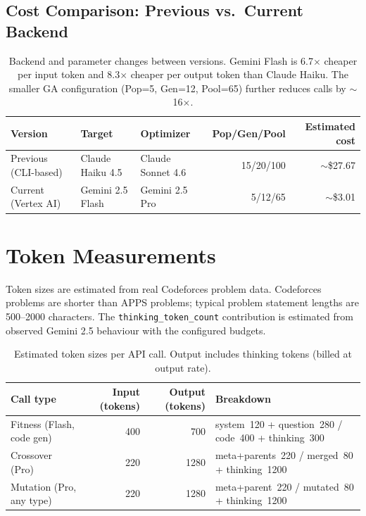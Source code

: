 \documentclass[11pt,a4paper]{report}
\begin{document}
\section{Cost Comparison: Previous vs.\ Current Backend}

\begin{table}[h]
\centering
\begin{tabular}{@{}lllrr@{}}
\toprule
\textbf{Version} & \textbf{Target} & \textbf{Optimizer} & \textbf{Pop/Gen/Pool} & \textbf{Estimated cost} \\
\midrule
Previous (CLI-based)  & Claude Haiku 4.5 & Claude Sonnet 4.6 & 15/20/100 & $\sim$\$27.67 \\
Current (Vertex AI)   & Gemini 2.5 Flash & Gemini 2.5 Pro    & 5/12/65   & $\sim$\$3.01 \\
\bottomrule
\end{tabular}
\caption{Backend and parameter changes between versions.
         Gemini Flash is 6.7$\times$ cheaper per input token and 8.3$\times$ cheaper
         per output token than Claude Haiku.  The smaller GA configuration
         (Pop=5, Gen=12, Pool=65) further reduces calls by $\sim$16$\times$.}
\end{table}


\chapter{Token Measurements}

Token sizes are estimated from real Codeforces problem data.  Codeforces problems
are shorter than APPS problems; typical problem statement lengths are 500--2000 characters.
The \texttt{thinking\_token\_count} contribution is estimated from observed Gemini 2.5
behaviour with the configured budgets.

\begin{table}[h]
\centering
\begin{tabular}{@{}lrrl@{}}
\toprule
\textbf{Call type} & {\textbf{Input (tokens)}} & {\textbf{Output (tokens)}} & \textbf{Breakdown} \\
\midrule
Fitness (Flash, code gen)  & 400  & 700  & system~120 + question~280 / code~400 + thinking~300 \\
Crossover (Pro)            & 220  & 1280 & meta+parents~220 / merged~80 + thinking~1200 \\
Mutation (Pro, any type)   & 220  & 1280 & meta+parent~220 / mutated~80 + thinking~1200 \\
\bottomrule
\end{tabular}
\caption{Estimated token sizes per API call.  Output includes thinking tokens (billed at output rate).}
\label{tab:tokens}
\end{table}
\end{document}
